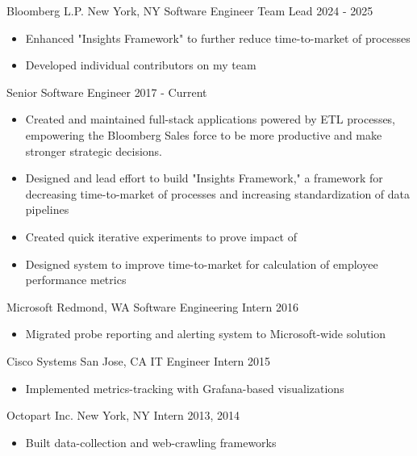 \documentclass[]{friggeri-cv}
\begin{document}
\begin{entrylist}
  \entryheader
    {Bloomberg L.P.}
    {New York, NY}
  \entry
    {Software Engineer Team Lead}
    {2024 - 2025}
    {
    \begin{itemize}
        \item Enhanced "Insights Framework" to further reduce time-to-market of processes
        \item Developed individual contributors on my team
    \end{itemize}
    }
  \entry
    {Senior Software Engineer}
    {2017 - Current}
    {
    \begin{itemize}
        \item Created and maintained full-stack applications powered by ETL processes, empowering the Bloomberg Sales force to be more productive and make stronger strategic decisions.
        \item Designed and lead effort to build "Insights Framework," a framework for decreasing time-to-market of processes and increasing standardization of data pipelines
        \item Created quick iterative experiments to prove impact of
        \item Designed system to improve time-to-market for calculation of employee performance metrics
    \end{itemize}
    }
  \entryheader
    {Microsoft}
    {Redmond, WA}
  \entry
    {Software Engineering Intern}
    {2016}
    {
    \begin{itemize}
        \item Migrated probe reporting and alerting system to Microsoft-wide solution
    \end{itemize}
    }
  \entryheader
    {Cisco Systems}
    {San Jose, CA}
  \entry
    {IT Engineer Intern}
    {2015}
    {
    \begin{itemize}
        \item Implemented metrics-tracking with Grafana-based visualizations
    \end{itemize}
    }
  \entryheader
    {Octopart Inc.}
    {New York, NY}
  \entry
    {Intern}
    {2013, 2014}
    {
    \begin{itemize}
        \item Built data-collection and web-crawling frameworks
    \end{itemize}
    }
\end{entrylist}
\end{document}
